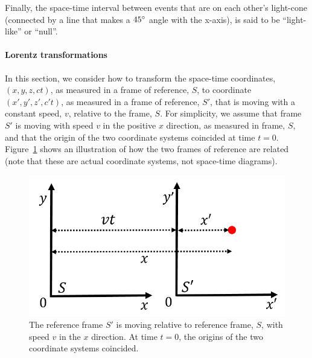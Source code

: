 Finally, the space-time interval between events that are on each other's light-cone (connected by a line that makes a $45 {\rm \degree}$ angle with the x-axis), is said to be ``light-like'' or ``null''.

\paragraph{Lorentz transformations}

In this section, we consider how to transform the space-time coordinates, $(x,y,z,ct)$, as measured in a frame of reference, $S$, to coordinate $(x',y',z',c't)$, as measured in a frame of reference, $S'$, that is moving with a constant speed, $v$, relative to the frame, $S$. For simplicity, we assume that frame $S'$ is moving with speed $v$ in the positive $x$ direction, as measured in frame, $S$, and that the origin of the two coordinate systems coincided at time $t=0$. Figure~\ref{fig:specialrelativity:translation} shows an illustration of how the two frames of reference are related (note that these are actual coordinate systems, not space-time diagrams).

\begin{figure}[!htbp]
\centering
\includegraphics[width=0.5\linewidth]{files/translation-645d294e4cbfefbcdd841cbac530336d.png}
\caption[]{The reference frame $S'$ is moving relative to reference frame, $S$, with speed $v$ in the $x$ direction. At time $t=0$, the origins of the two coordinate systems coincided.}
\label{fig:specialrelativity:translation}
\end{figure}

